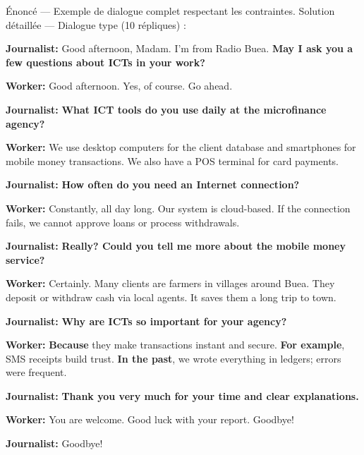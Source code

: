 \documentclass[11pt]{article}
\begin{document}
\begin{exoresolu}
Énoncé — Exemple de dialogue complet respectant les contraintes.
\tcblower
Solution détaillée — Dialogue type (10 répliques) :

\textbf{Journalist:} Good afternoon, Madam. I'm from Radio Buea. \textbf{May I ask you a few questions about ICTs in your work?}

\textbf{Worker:} Good afternoon. Yes, of course. Go ahead.

\textbf{Journalist:} \textbf{What ICT tools do you use daily at the microfinance agency?}

\textbf{Worker:} We use desktop computers for the client database and smartphones for mobile money transactions. We also have a POS terminal for card payments.

\textbf{Journalist:} \textbf{How often do you need an Internet connection?}

\textbf{Worker:} Constantly, all day long. Our system is cloud-based. If the connection fails, we cannot approve loans or process withdrawals.

\textbf{Journalist:} \textbf{Really? Could you tell me more about the mobile money service?}

\textbf{Worker:} Certainly. Many clients are farmers in villages around Buea. They deposit or withdraw cash via local agents. It saves them a long trip to town.

\textbf{Journalist:} \textbf{Why are ICTs so important for your agency?}

\textbf{Worker:} \textbf{Because} they make transactions instant and secure. \textbf{For example}, SMS receipts build trust. \textbf{In the past}, we wrote everything in ledgers; errors were frequent.

\textbf{Journalist:} \textbf{Thank you very much for your time and clear explanations.}

\textbf{Worker:} You are welcome. Good luck with your report. Goodbye!

\textbf{Journalist:} Goodbye!
\end{exoresolu}
\end{document}
